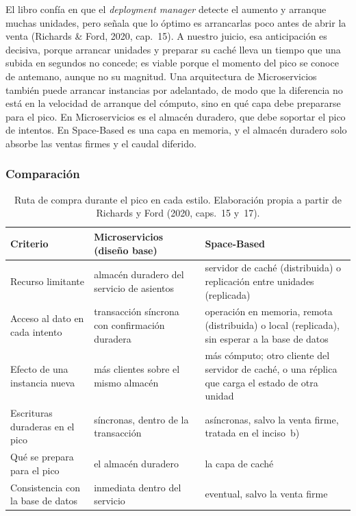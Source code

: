 El libro confía en que el \emph{deployment manager} detecte el aumento y arranque
muchas unidades, pero señala que lo óptimo es arrancarlas poco antes de abrir la
venta (Richards \& Ford, 2020, cap.~15). A nuestro juicio, esa anticipación es
decisiva, porque arrancar unidades y preparar su caché lleva un tiempo que una subida
en segundos no concede; es viable porque el momento del pico se conoce de antemano,
aunque no su magnitud. Una arquitectura de Microservicios también puede arrancar
instancias por adelantado, de modo que la diferencia no está en la velocidad de
arranque del cómputo, sino en qué capa debe prepararse para el pico. En Microservicios
es el almacén duradero, que debe soportar el pico de intentos. En Space-Based es una
capa en memoria, y el almacén duradero solo absorbe las ventas firmes y el caudal diferido.

\subsubsection{Comparación}

\begin{table}[H]
  \centering
  \caption{Ruta de compra durante el pico en cada estilo. Elaboración propia a partir
    de Richards y Ford (2020, caps.~15 y~17).}
  \label{tab:p2a-comparacion}
  \small
  \renewcommand{\arraystretch}{1.35}
  \begin{tabularx}{\textwidth}{>{\raggedright\arraybackslash}p{3.6cm} >{\raggedright\arraybackslash}X >{\raggedright\arraybackslash}X}
    \toprule
    \textbf{Criterio} & \textbf{Microservicios (diseño base)} & \textbf{Space-Based} \\
    \midrule
    Recurso limitante &
      almacén duradero del servicio de asientos &
      servidor de caché (distribuida) o replicación entre unidades (replicada) \\
    Acceso al dato en cada intento &
      transacción síncrona con confirmación duradera &
      operación en memoria, remota (distribuida) o local (replicada), sin esperar a la base de datos \\
    Efecto de una instancia nueva &
      más clientes sobre el mismo almacén &
      más cómputo; otro cliente del servidor de caché, o una réplica que carga el estado de otra unidad \\
    Escrituras duraderas en el pico &
      síncronas, dentro de la transacción &
      asíncronas, salvo la venta firme, tratada en el inciso~b) \\
    Qué se prepara para el pico &
      el almacén duradero &
      la capa de caché \\
    Consistencia con la base de datos &
      inmediata dentro del servicio &
      eventual, salvo la venta firme \\
    \bottomrule
  \end{tabularx}
\end{table}

